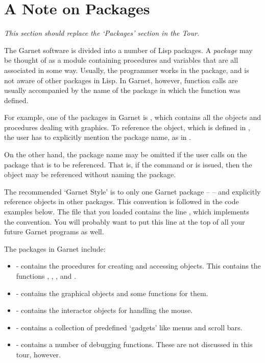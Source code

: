 \chapter{A Note on Packages}

{\it This section should replace the `Packages' section in the Tour.}

The Garnet software is divided into a number of Lisp packages.  A
{\it package} may be thought of as a module containing procedures and
variables that are all associated in some way.  Usually, the
programmer works in the  package, and is not aware of
other packages in Lisp.  In Garnet, however, function calls are
usually accompanied by the name of the package in which the function
was defined.

For example, one of the packages in Garnet is , which
contains all the objects and procedures dealing with graphics.  To
reference the  object, which is defined in ,
the user has to explicitly mention the package name, as in
.

On the other hand, the package name may be omitted if the user
calls  on the package that is to be referenced.  That
is, if the command  or  is issued, then the  object may be referenced
without naming the  package.

The recommended `Garnet Style' is to  only one
Garnet package --  -- and explicitly reference objects in other
packages.  This convention is followed in the code examples below.
The file  that you loaded contains the line
, which implements the convention.  You will
probably want to put this line at the top of all your future Garnet
programs as well.

The packages in Garnet include:
\begin{itemize}
\item {} - contains the procedures for creating and accessing objects.  This
contains the functions ,
, , and .

\item {} - contains the graphical objects and some functions for them.

\item {} - contains the interactor objects for handling the mouse.

\item {} - contains a collection of predefined `gadgets' like
menus and scroll bars.

\item {} - contains a number of debugging functions.  These are
not discussed in this tour, however.

\end{itemize}

